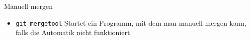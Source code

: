 \begin{frame}{Manuell mergen}
  \begin{itemize}
    \item \texttt{git mergetool} Startet ein Programm, mit dem man manuell mergen kann, falls die Automatik nicht funktioniert
  \end{itemize}
\end{frame}
